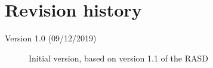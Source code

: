 \section{Revision history}
\begin{description}
    \item[Version 1.0 (09/12/2019)] Initial version, based on version 1.1 of the
    RASD
\end{description}